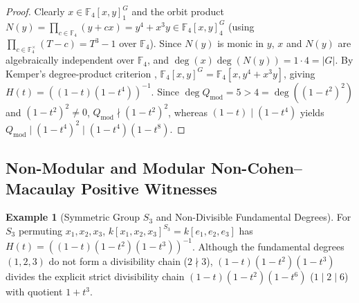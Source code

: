 \documentclass[11pt]{article}
\theoremstyle{definition}
\newtheorem{example}[theorem]{Example}
\theoremstyle{remark}
\begin{document}
\begin{proof}
Clearly $x \in \mathbb{F}_4[x,y]_1^G$ and the orbit product $N(y) = \prod_{c \in \mathbb{F}_4} (y + cx) = y^4 + x^3 y \in \mathbb{F}_4[x,y]_4^G$ (using $\prod_{c \in \mathbb{F}_4^{\times}} (T - c) = T^3 - 1$ over $\mathbb{F}_4$). Since $N(y)$ is monic in $y$, $x$ and $N(y)$ are algebraically independent over $\mathbb{F}_4$, and $\deg(x)\deg(N(y)) = 1 \cdot 4 = |G|$. By Kemper's degree-product criterion \cite[Theorem~3.7.5]{DerksenKemper}, $\mathbb{F}_4[x,y]^G = \mathbb{F}_4[x, y^4 + x^3 y]$, giving $H(t) = ((1 - t)(1 - t^4))^{-1}$. Since $\deg Q_{\mathrm{mod}} = 5 > 4 = \deg((1 - t^2)^2)$ and $(1 - t^2)^2 \ne 0$, $Q_{\mathrm{mod}} \nmid (1 - t^2)^2$, whereas $(1 - t) \mid (1 - t^4)$ yields $Q_{\mathrm{mod}} \mid (1 - t^4)^2 \mid (1 - t^4)(1 - t^8)$.
\end{proof}

\subsection{Non-Modular and Modular Non-Cohen--Macaulay Positive Witnesses}

\begin{example}[Symmetric Group $S_3$ and Non-Divisible Fundamental Degrees]
\label{ex:s3}
For $S_3$ permuting $x_1,x_2,x_3$, $k[x_1,x_2,x_3]^{S_3} = k[e_1,e_2,e_3]$ has $H(t) = ((1 - t)(1 - t^2)(1 - t^3))^{-1}$. Although the fundamental degrees $(1,2,3)$ do not form a divisibility chain ($2 \nmid 3$), $(1 - t)(1 - t^2)(1 - t^3)$ divides the explicit strict divisibility chain $(1 - t)(1 - t^2)(1 - t^6)$ ($1 \mid 2 \mid 6$) with quotient $1 + t^3$.
\end{example}
\end{document}
